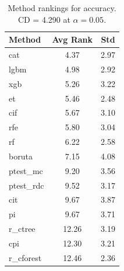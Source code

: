 \begin{table}[h]
\centering
\caption{Method rankings for accuracy. CD = 4.290 at $\alpha=0.05$.}
\label{tab:ranks_accuracy}
\begin{tabular}{lcc}
\toprule
Method & Avg Rank & Std \\
\midrule
cat & 4.37 & 2.97 \\
lgbm & 4.98 & 2.92 \\
xgb & 5.26 & 3.22 \\
et & 5.46 & 2.48 \\
cif & 5.67 & 3.10 \\
rfe & 5.80 & 3.04 \\
rf & 6.22 & 2.58 \\
boruta & 7.15 & 4.08 \\
ptest_mc & 9.20 & 3.56 \\
ptest_rdc & 9.52 & 3.17 \\
cit & 9.67 & 3.87 \\
pi & 9.67 & 3.71 \\
r_ctree & 12.26 & 3.19 \\
cpi & 12.30 & 3.21 \\
r_cforest & 12.46 & 2.36 \\
\bottomrule
\end{tabular}
\end{table}